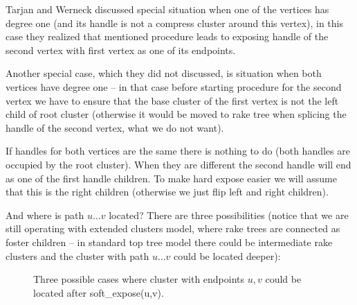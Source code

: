 Tarjan and Werneck discussed special situation when one of the vertices has
degree one (and its handle is not a compress cluster around this vertex), in
this case they realized that mentioned procedure leads to exposing handle of the
second vertex with first vertex as one of its endpoints.

Another special case, which they did not discussed, is situation when both
vertices have degree one -- in that case before starting procedure for the
second vertex we have to ensure that the base cluster of the first vertex is not
the left child of root cluster (otherwise it would be moved to rake tree when
splicing the handle of the second vertex, what we do not want).

If handles for both vertices are the same there is nothing to do (both handles
are occupied by the root cluster). When they are different the second handle
will end as one of the first handle children. To make hard expose easier we will
assume that this is the right children (otherwise we just flip left and right
children).

And where is path $u\dots v$ located? There are three possibilities (notice that
we are still operating with extended clusters model, where rake trees are
connected as foster children -- in standard top tree model there could be
intermediate rake clusters and the cluster with path $u\dots v$ could be located
deeper):

\begin{figure}[H]
\centering
{}
\caption{Three possible cases where cluster with endpoints $u,v$ could be located
after {\I soft\_expose(u,v)}.}
\end{figure}


